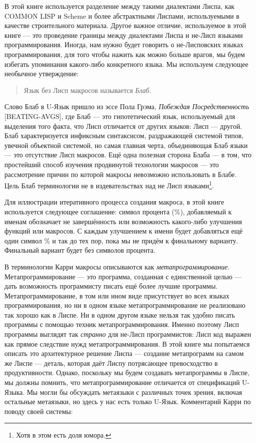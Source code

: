 В этой книге используется разделение между такими диалектами Лиспа, как COMMON LISP и Scheme и более абстрактными Лиспами, используемыми в качестве строительного материала. Другое важное отличие, используемое в этой книге --- это проведение границы между диалектами Лиспа и не-Лисп языками программирования. Иногда, нам нужно будет говорить о не-Лисповских языках программирования, для того чтобы нажить как можно больше врагов, мы будем избегать упоминания какого-либо конкретного языка. Мы используем следующее необычное утверждение:

\begin{quote}
Язык без Лисп макросов называется \emph{Блаб}.
\end{quote}

Слово Блаб в U-Язык пришло из эссе Пола Грэма, \emph{Побеждая Посредственность} [BEATING-AVGS], где Блаб --- это гипотетический язык, используемый для выделения того факта, что Лисп отличается от других языков: Лисп --- другой. Блаб характеризуется инфиксным синтаксисом, раздражающей системой типов, увечной объектной системой, но самая главная черта, объединяющая Блаб языки --- это отсутствие Лисп макросов. Ещё одна полезная сторона Блаба --- в том, что простейший способ изучения продвинутой технологии макросов --- это рассмотрение причин по которой макросы невозможно использовать в Блабе. Цель Блаб терминологии не в издевательствах над не Лисп языками\footnote{Хотя в этом есть доля юмора.}.

Для иллюстрации итеративного процесса создания макроса, в этой книге используется следующее соглашение: символ процента (\%), добавляемый к именам обозначает не завершённость или возможность какого-либо улучшения функций или макросов. С каждым улучшением к имени будет добавляться ещё один символ \% и так до тех пор, пока мы не придём к финальному варианту. Финальный вариант будет без символов процента.

В терминологии Карри макросы описываются как \emph{метапрограммирование}. Метапрограммирование --- это программа, созданная с единственной целью --- дать возможность программисту писать ещё более лучшие программы. Метапрограммирование, в том или ином виде присутствует во всех языках программирования, но ни в одном языке метапрограммирование не реализовано так хорошо как в Лиспе. Ни в одном другом языке нельзя так удобно писать программы с помощью техник метапрограммирования. Именно поэтому Лисп программы выглядят так \emph{странно} для не-Лисп программистов: Лисп код выражен как прямое следствие нужд метапрограммирования. В этой книге мы попытаемся описать это архитектурное решение Лиспа --- создание метапрограмм на самом же Лиспе --- деталь, которая даёт Лиспу потрясающее превосходство в продуктивности. Однако, поскольку мы будем создавать метапрограммы в Лиспе, мы должны помнить, что метапрограммирование отличается от спецификаций U-Языка. Мы могли бы обсуждать метаязыки с различных точек зрения, включая остальные метаязыки, но здесь у нас есть только U-Язык. Комментарий Карри по поводу своей системы:

